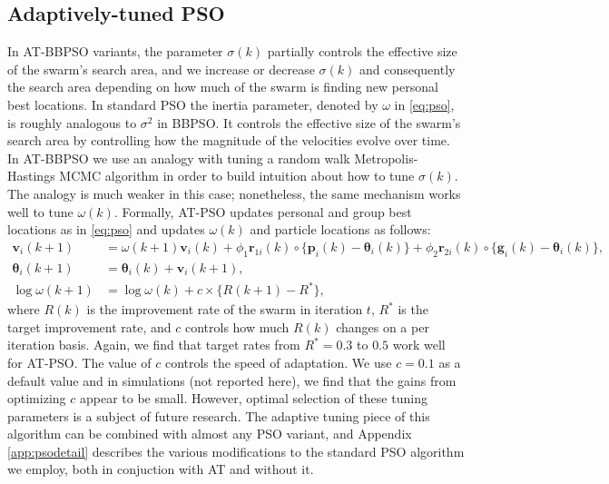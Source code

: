 \documentclass[cmbright]{staauth}
\begin{document}
\subsection{Adaptively-tuned PSO}\label{sec:AT-PSO}
In AT-BBPSO variants, the parameter $\sigma(k)$ partially controls the effective size of the swarm's search area, and we increase or decrease $\sigma(k)$ and consequently the search area depending on how much of the swarm is finding new personal best locations. In standard PSO the inertia parameter, denoted by $\omega$ in \eqref{eq:pso}, is roughly analogous to $\sigma^2$ in BBPSO. It controls the effective size of the swarm's search area by controlling how the magnitude of the velocities evolve over time. In AT-BBPSO we use an analogy with tuning a random walk Metropolis-Hastings MCMC algorithm in order to build intuition about how to tune $\sigma(k)$. The analogy is much weaker in this case; nonetheless, the same mechanism works well to tune $\omega(k)$. Formally, AT-PSO updates personal and group best locations as in \eqref{eq:pso} and updates $\omega(k)$ and particle locations as follows:
\begin{align}\label{eq:atpso}
\bm{v}_i(k+1) &= \omega(k+1) \bm{v}_i(k) + \phi_1 \bm{r}_{1i}(k)\circ\{\bm{p}_i(k) - \bm{\theta}_i(k)\} + \phi_2 \bm{r}_{2i}(k)\circ\{\bm{g}_i(k) - \bm{\theta}_i(k)\},\nonumber\\
\bm{\theta}_i(k+1) &= \bm{\theta}_i(k) + \bm{v}_i(k+1),\nonumber\\
\log\omega(k+1)& = \log\omega(k) + c\times\{R(k+1) - R^*\},
\end{align}
where $R(k)$ is the improvement rate of the swarm in iteration $t$, $R^*$ is the target improvement rate, and $c$ controls how much $R(k)$ changes on a per iteration basis. Again, we find that target rates from $R^*=0.3$ to $0.5$ work well for AT-PSO. The value of $c$ controls the speed of adaptation. We use $c=0.1$ as a default value and in simulations (not reported here), we find that the gains from optimizing $c$ appear to be small. However, optimal selection of these tuning parameters is a subject of future research. The adaptive tuning piece of this algorithm can be combined with almost any PSO variant, and Appendix \ref{app:psodetail} describes the various modifications to the standard PSO algorithm we employ, both in conjuction with AT and without it.
\end{document}
